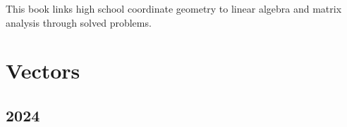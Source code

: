 \documentclass[11pt]{book}
\begin{document}

\setcounter{page}{1}

\begin{introduction}
This book links high school coordinate geometry to linear algebra and matrix analysis through solved problems.

\end{introduction}

\mainmatter

\chapter{Vectors}
\section{2024}
\end{document}
